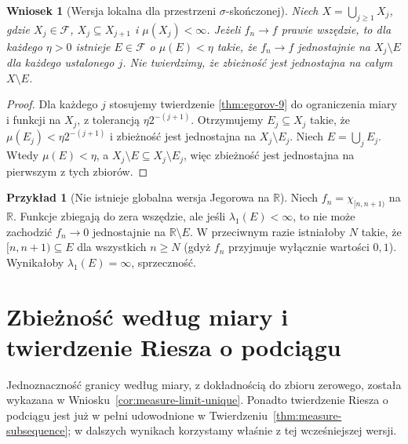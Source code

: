 \documentclass[11pt,a4paper,oneside]{book}
\numberwithin{equation}{chapter}
\theoremstyle{plain}
\newtheorem{wniosek}[twierdzenie]{Wniosek}
\theoremstyle{definition}
\newtheorem{przyklad}[twierdzenie]{Przykład}
\theoremstyle{remark}
\begin{document}
\begin{wniosek}[Wersja lokalna dla przestrzeni $\sigma$-skończonej]
\label{cor:local-egorov-9}
Niech $X=\bigcup_{j\ge1}X_j$, gdzie $X_j\in\mathcal F$,
$X_j\subseteq X_{j+1}$ i $\mu(X_j)<\infty$.
Jeżeli $f_n\to f$ prawie wszędzie, to dla każdego
$\eta>0$ istnieje $E\in\mathcal F$ o $\mu(E)<\eta$
takie, że $f_n\to f$ jednostajnie na
$X_j\setminus E$ dla każdego ustalonego $j$.
Nie twierdzimy, że zbieżność jest jednostajna
na całym $X\setminus E$.
\end{wniosek}
\begin{proof}
Dla każdego $j$ stosujemy twierdzenie
\ref{thm:egorov-9} do ograniczenia miary i funkcji
na $X_j$, z tolerancją $\eta 2^{-(j+1)}$.
Otrzymujemy $E_j\subseteq X_j$ takie, że
$\mu(E_j)<\eta 2^{-(j+1)}$ i zbieżność jest
jednostajna na $X_j\setminus E_j$.
Niech $E=\bigcup_jE_j$. Wtedy $\mu(E)<\eta$, a
$X_j\setminus E\subseteq X_j\setminus E_j$,
więc zbieżność jest jednostajna na pierwszym z tych
zbiorów.
\end{proof}

\begin{przyklad}[Nie istnieje globalna wersja Jegorowa na $\mathbb R$]
Niech $f_n=\chi_{[n,n+1)}$ na $\mathbb R$.
Funkcje zbiegają do zera wszędzie, ale jeśli
$\lambda_1(E)<\infty$, to nie może zachodzić
$f_n\to0$ jednostajnie na $\mathbb R\setminus E$.
W przeciwnym razie istniałoby $N$ takie, że
$[n,n+1)\subseteq E$ dla wszystkich $n\ge N$
(gdyż $f_n$ przyjmuje wyłącznie wartości $0,1$).
Wynikałoby $\lambda_1(E)=\infty$, sprzeczność.
\end{przyklad}

\section{Zbieżność według miary i twierdzenie Riesza o podciągu}

Jednoznaczność granicy według miary, z dokładnością do zbioru zerowego,
została wykazana w Wniosku~\ref{cor:measure-limit-unique}.
Ponadto twierdzenie Riesza o podciągu jest już w pełni
udowodnione w Twierdzeniu~\ref{thm:measure-subsequence};
w dalszych wynikach korzystamy właśnie z tej wcześniejszej wersji.
\end{document}
